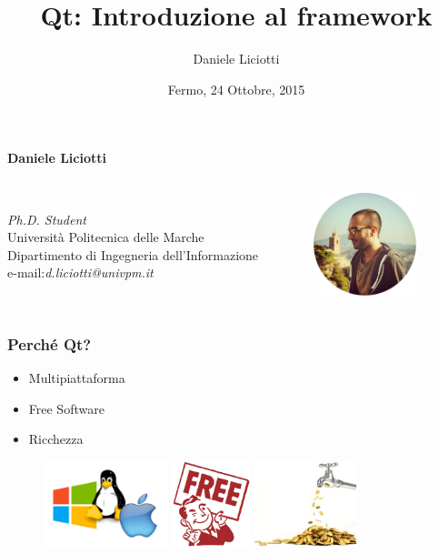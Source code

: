 \documentclass[10pt]{beamer}
\title{Qt: Introduzione al framework}
\subtitle{}
\author{Daniele Liciotti}
\institute{ICT Engineer and PhD Student}
\date{Fermo, 24 Ottobre, 2015}
\begin{document}
\maketitle
\begin{frame}
	\begin{block}{\textbf{Daniele Liciotti}}
		\begin{columns}
			\vspace{1cm}\\
			\emph{Ph.D. Student}\\
			Università Politecnica delle Marche\\
			Dipartimento di Ingegneria dell'Informazione\\
			
			\vspace{1cm}
			e-mail:\qquad \emph{d.liciotti@univpm.it}
			\begin{figure}
				\centering
				\includegraphics[height=3cm]{images/me.png}
			\end{figure}
		\end{columns}
	\end{block}
\end{frame}
\begin{frame}
	\frametitle{Perché Qt?}
	\begin{itemize}
		\item Multipiattaforma
		\item Free Software
		\item Ricchezza
	\end{itemize}
	\begin{figure}
		\includegraphics[height=2.5cm]{images/multiplat.png}
		\qquad
		\includegraphics[height=2.5cm]{images/free.png}
		\qquad
		\includegraphics[height=2.5cm]{images/money.jpg}
	\end{figure}
\end{frame}
\end{document}
